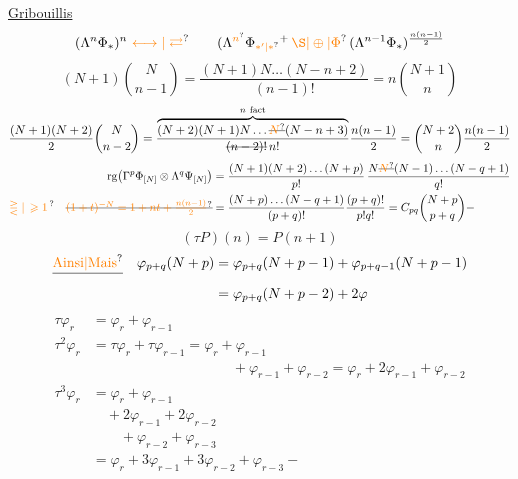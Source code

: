 \uline{Gribouillis}
\[
(\Lambda^n\Phi_*)^n\ \unsure{\longleftrightarrow|\rightleftarrows}\qquad
(\Lambda^{\unsure{n}}\Phi_{\unsure{*'|*}}{}^{+}\,\unsure{\S|\oplus|\Phi}\,(\Lambda^{n-1}\Phi_*)^{\frac{n(n-1)}{2}}
\]
\[
(N+1)\binom N{n-1}=\frac{(N+1)N\ldots(N-n+2)}{(n-1)!}=n\binom{N+1}n
\]
\[
\frac{(N+1)(N+2)}{2}\binom{N}{n-2}
=\frac{\overbrace{(N+2)(N+1)N\ldots\deleted{\unsure{N}}(N-n+3)}^{n\ \text{fact}}}{\deleted{(n-2)!}\,n!}\frac{n(n-1)}2
=\binom{N+2}{n}\frac{n(n-1)}2
\]
\[
\begin{aligned}
\operatorname{rg}\bigl(\Gamma^p\Phi_{[N]}\otimes\Lambda^q\Psi_{[N]}\bigr)
&=\frac{(N+1)(N+2)\ldots(N+p)}{p!}\,\frac{N\deleted{\unsure{N}}(N-1)\ldots(N-q+1)}{q!}\\
\unsure{\gtreqless|\,\geqslant1\,}\quad
\deleted{\unsure{(1+t)^{-N}=1+nt+\frac{n(n-1)}2}}&=\frac{(N+p)\ldots(N-q+1)}{(p+q)!}\frac{(p+q)!}{p!q!}=C_{pq}\binom{N+p}{p+q}-
\end{aligned}
\]
\[
(\tau P)(n)=P(n+1)
\]
\[
\begin{aligned}
\deleted{\unsure{\text{Ainsi}|\text{Mais}}}\quad\varphi_{p+q}(N+p)&=\varphi_{p+q}(N+p-1)+\varphi_{p+q-1}(N+p-1)\\
&=\varphi_{p+q}(N+p-2)+2\varphi
\end{aligned}
\]
\[
\begin{aligned}
\tau\varphi_r&=\varphi_r+\varphi_{r-1}\\
\tau^2\varphi_r&=\tau\varphi_r+\tau\varphi_{r-1}=\varphi_r+\varphi_{r-1}\\
&\hspace{10em}+\varphi_{r-1}+\varphi_{r-2}
=\varphi_r+2\varphi_{r-1}+\varphi_{r-2}\\
\tau^3\varphi_r&=\varphi_r+\varphi_{r-1}\\
&\quad+2\varphi_{r-1}+2\varphi_{r-2}\\
&\qquad+\varphi_{r-2}+\varphi_{r-3}\\
&=\varphi_r+3\varphi_{r-1}+3\varphi_{r-2}+\varphi_{r-3}-
\end{aligned}
\]
